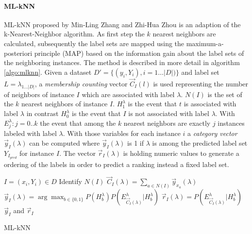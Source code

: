 					\paragraph{ML-kNN}
					\label{para:mlknn}
						ML-kNN proposed by Min-Ling Zhang and Zhi-Hua Zhou \cite{Zhang05} is an adaption of the k-Nearest-Neighbor algorithm. As first step the $k$ nearest neighbors are calculated, subsequently the label sets are mapped using the maximum-a-posteriori principle (MAP) based on the information gain about the label sets of the neighboring instances. The method is described in more detail in algorithm \ref{algo:mlknn}. Given a dataset \mbox{$ D'=\{(y_i,Y_i),i=1\hdots |D|)\}$} and label set $ L=\lambda_{1\hdots|D|}$, a \textit{membership counting} vector $ \vec{C}_I(l) $ is used representing the number of neighbors of instance $ I $ which are associated with label $\lambda$. $ N(I) $ is the set of the $k$ nearest neighbors of instance $I$. $H^\lambda_1$ is the event that $t$ is associated with label $\lambda$ in contrast $H^\lambda_0$ is the event that $I$ is not associated with label $\lambda$. With $E^\lambda_j:j=0..k$ the event that among the $k$ nearest neighbors are exactly $j$ instances labeled with label $\lambda$.
With those variables for each instance $i$ a \textit{category vector} $\vec{y}_I(\lambda)$ can be computed where $ \vec{y}_I(\lambda) $ is 1 if $ \lambda $ is among the predicted label set $Y_{I_{pred}} $ for instance $I$. The vector $\vec{r}_I(\lambda)$ is holding numeric values to generate a ordering of the labels in order to predict a ranking instead a fixed label set.

						\begin{algorithm}
							\begin{algorithmic}
								\REQUIRE $ I = (x_i,Y_i) \in D $  
								\STATE Identify $N(I)$ 
									\STATE $\vec{C}_I(\lambda)=\sum_{a\in N(I)}\vec{y}_{x_a}(\lambda)$ 
									\STATE $\vec{y}_I(\lambda)=\arg\max_{b\in \{0,1\}} P(H^\lambda_b)P(E^\lambda_{\vec{C}_I(\lambda)}|H^\lambda_b)$ 
									\STATE $\vec{r}_I(\lambda)=P(E^\lambda_{\vec{C}_I(\lambda)}|H^\lambda_b)$ 
								\ENDFOR
								\RETURN $\vec{y}_I$ and $\vec{r}_I$
							\end{algorithmic}
							\caption{ML-kNN} 
							\label{algo:mlknn}
						\end{algorithm}

